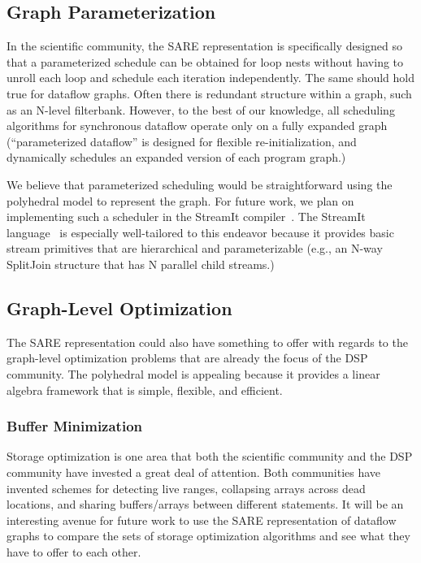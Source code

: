\subsection{Graph Parameterization}

In the scientific community, the SARE representation is specifically
designed so that a parameterized schedule can be obtained for loop
nests without having to unroll each loop and schedule each iteration
independently.  The same should hold true for dataflow graphs.  Often
there is redundant structure within a graph, such as an N-level
filterbank.  However, to the best of our knowledge, all scheduling
algorithms for synchronous dataflow operate only on a fully expanded
graph (``parameterized dataflow''\cite{Bhatt00} is designed for
flexible re-initialization, and dynamically schedules an expanded
version of each program graph.)

We believe that parameterized scheduling would be straightforward
using the polyhedral model to represent the graph.  For future work,
we plan on implementing such a scheduler in the StreamIt
compiler~\cite{Gordo02}.  The StreamIt language~\cite{streamitcc} is
especially well-tailored to this endeavor because it provides basic
stream primitives that are hierarchical and parameterizable (e.g., an
N-way SplitJoin structure that has N parallel child streams.)

\subsection{Graph-Level Optimization}

The SARE representation could also have something to offer with
regards to the graph-level optimization problems that are already the
focus of the DSP community.  The polyhedral model is appealing because
it provides a linear algebra framework that is simple, flexible, and
efficient.

\subsubsection{Buffer Minimization}

Storage optimization is one area that both the scientific
community\cite{Lim01,Quillere,Thies01,Lefebvre98} and the DSP
community\cite{murt1997x1,GGD94,murt2001x1} have invested a great deal
of attention.  Both communities have invented schemes for detecting
live ranges, collapsing arrays across dead locations, and sharing
buffers/arrays between different statements.  It will be an
interesting avenue for future work to use the SARE representation of
dataflow graphs to compare the sets of storage optimization algorithms
and see what they have to offer to each other.

